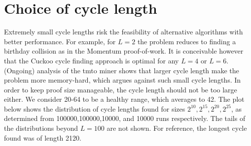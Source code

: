 \documentclass[11pt, oneside]{article}
\begin{document}
\section{Choice of cycle length}
Extremely small cycle lengths risk the feasibility of alternative algorithms with better performance.
For example, for $L=2$ the problem reduces to finding a birthday collision
as in the Momentum proof-of-work.
It is conceivable however that the Cuckoo cycle finding approach is optimal for any $L=4$ or $L=6$.
(Ongoing) analysis of the tmto miner shows that larger cycle length make the problem more memory-hard,
which argues against such small cycle lengths.
In order to keep proof size manageable, the cycle length should not be too large either.
We consider 20-64 to be a healthy range, which averages to 42.
The plot below shows the distribution of cycle lengths found for sizes $2^{10},2^{15},2^{20},2^{25}$,
as determined from 100000,100000,10000, and 10000 runs respectively. The tails of the distributions
beyond $L=100$ are not shown. For reference, the longest cycle found was of length 2120.
\end{document}
